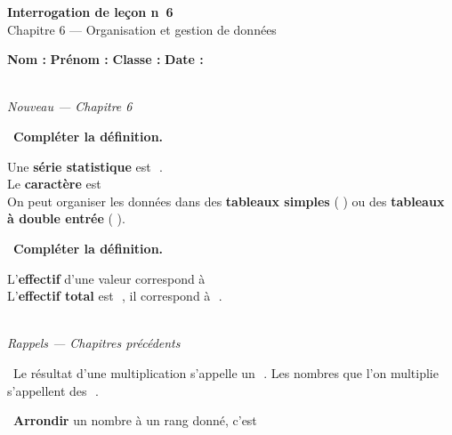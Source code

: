 \documentclass[a4paper,11pt]{article}
\newcommand{\bl}[1][4cm]{\,\makebox[#1]{\dotfill}\,}
\newcommand{\coeur}{\textcolor{Couleur8}{\faHeart}\ }
\newcommand{\coeurrappel}{\textcolor{Couleur6}{\faHeart}\ }
\begin{document}
\begin{mdframed}[linecolor=Couleur1,linewidth=2pt,topline=true,bottomline=true,leftline=false,rightline=false,innertopmargin=8pt,innerbottommargin=8pt,backgroundcolor=Couleur1!5]
\begin{center}
{\Large\bfseries\textcolor{Couleur1}{Interrogation de le\c{c}on n\degre~6}}\\[4pt]
{\large\textcolor{Couleur8}{Chapitre 6 --- Organisation et gestion de donn\'ees}}
\end{center}
\end{mdframed}
\vspace{0.4cm}
\noindent\textbf{Nom :} \dotfill\quad\textbf{Pr\'enom :} \dotfill\quad\textbf{Classe :} \dotfill\quad\textbf{Date :} \dotfill
\vspace{0.5cm}

\vspace{0.3cm}
\noindent{\textcolor{Couleur8}{\rule{\textwidth}{0.5pt}}}\\
{\small\textit{\textcolor{Couleur8}{Nouveau --- Chapitre 6}}}
\vspace{0.1cm}

\noindent \coeur \textbf{Compl\'eter la d\'efinition.}
\begin{mdframed}[linecolor=Couleur6,linewidth=4pt,topline=false,bottomline=false,rightline=false,backgroundcolor=Couleur6!10,innerleftmargin=8pt,innertopmargin=6pt,innerbottommargin=6pt]
Une \textbf{s\'erie statistique} est \bl[7cm]. \\
Le \textbf{caract\`ere} est \bl[6cm]\dotfill\\On peut organiser les donn\'ees dans des \textbf{tableaux simples} (\bl[4cm]) ou des \textbf{tableaux \`a double entr\'ee} (\bl[4cm]).
\end{mdframed}

\noindent \coeur \textbf{Compl\'eter la d\'efinition.}
\begin{mdframed}[linecolor=Couleur6,linewidth=4pt,topline=false,bottomline=false,rightline=false,backgroundcolor=Couleur6!10,innerleftmargin=8pt,innertopmargin=6pt,innerbottommargin=6pt]
L'\textbf{effectif} d'une valeur correspond \`a \bl[7cm]\dotfill\\L'\textbf{effectif total} est \bl[7cm], il correspond \`a \bl[5cm].
\end{mdframed}

\vspace{0.3cm}
\noindent{\textcolor{Couleur8}{\rule{\textwidth}{0.5pt}}}\\
{\small\textit{\textcolor{Couleur8}{Rappels --- Chapitres pr\'ec\'edents}}}
\vspace{0.1cm}

\noindent \coeurrappel Le r\'esultat d'une multiplication s'appelle un \bl[2.5cm]. Les nombres que l'on multiplie s'appellent des \bl[2.5cm].

\noindent \coeurrappel \textbf{Arrondir} un nombre \`a un rang donn\'e, c'est \dotfill
\end{document}
